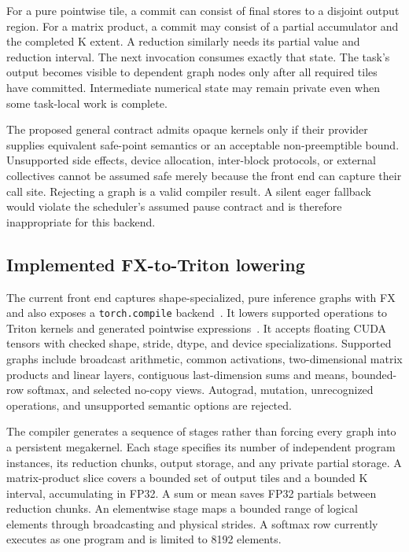 For a pure pointwise tile, a commit can consist of final stores to a disjoint
output region. For a matrix product, a commit may consist of a partial
accumulator and the completed K extent. A reduction similarly needs its
partial value and reduction interval. The next invocation consumes exactly
that state. The task's output becomes visible to dependent graph nodes only
after all required tiles have committed. Intermediate numerical state may
remain private even when some task-local work is complete.

The proposed general contract admits opaque kernels only if their provider
supplies equivalent safe-point semantics or an acceptable non-preemptible
bound. Unsupported side effects, device allocation, inter-block protocols,
or external collectives cannot be assumed safe merely because the front end
can capture their call site. Rejecting a graph is a valid compiler result.
A silent eager fallback would violate the scheduler's assumed pause contract
and is therefore inappropriate for this backend.

\subsection{Implemented FX-to-Triton lowering}
The current front end captures shape-specialized, pure inference graphs with
FX and also exposes a \texttt{torch.compile} backend~\cite{Reed2022FX}.
It lowers supported operations to Triton kernels and generated pointwise
expressions~\cite{Tillet2019Triton}. It accepts floating CUDA tensors with
checked shape, stride, dtype, and device specializations. Supported graphs
include broadcast arithmetic, common activations, two-dimensional matrix
products and linear layers, contiguous last-dimension sums and means,
bounded-row softmax, and selected no-copy views. Autograd, mutation,
unrecognized operations, and unsupported semantic options are rejected.

The compiler generates a sequence of stages rather than forcing every graph
into a persistent megakernel. Each stage specifies its number of independent
program instances, its reduction chunks, output storage, and any private
partial storage. A matrix-product slice covers a bounded set of output tiles
and a bounded K interval, accumulating in FP32. A sum or mean saves FP32
partials between reduction chunks. An elementwise stage maps a bounded
range of logical elements through broadcasting and physical strides. A
softmax row currently executes as one program and is limited to 8192 elements.

